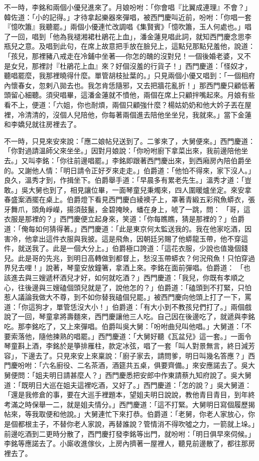 不一時，李銘和兩個小優兒進來了。月娘吩咐：「你會唱『比翼成連理』不會？」韓佐道：「小的記得。」才待拿起樂器來彈唱，被西門慶叫近前，吩咐：「你唱一套『憶吹簫』我聽罷。」兩個小優連忙改調唱《集賢賓》「憶吹簫，玉人何處也。」唱了一回，唱到「他為我褪湘裙杜鵑花上血」，潘金蓮見唱此詞，就知西門慶念思李瓶兒之意。及唱到此句，在席上故意把手放在臉兒上，這點兒那點兒羞他，說道：「孩兒，那裡豬八戒走在冷鋪中坐著──你怎的醜的沒對兒！一個後婚老婆，又不是女兒，那裡討『杜鵑花上血』來？好個沒羞的行貨子！」西門慶道：「怪奴才，聽唱罷麼，我那裡曉得什麼。單管胡枝扯葉的。」只見兩個小優又唱到：「一個相府內懷春女，忽剌八拋去也。我怎肯恁隨邪，又去把牆花亂折！」那西門慶只顧低著頭留心細聽。須臾唱畢，這潘金蓮就不憤他，兩個在席上只顧拌嘴起來。月娘有些看不上，便道：「六姐，你也耐煩，兩個只顧強什麼？楊姑奶奶和他大妗子丟在屋裡，冷清清的，沒個人兒陪他，你每著兩個進去陪他坐坐兒，我就來。」當下金蓮和李嬌兒就往房裡去了。

不一時，只見來安來說：「應二娘帖兒送到了。二爹來了，大舅便來。」西門慶道：「你對過請溫師父來坐坐。」因對月娘說：「你吩咐廚下拿菜出來，我前邊陪他坐去。」又叫李銘：「你往前邊唱罷。」李銘即跟著西門慶出來，到西廂房內陪伯爵坐的。又謝他人情：「明日請令正好歹來走走。」伯爵道：「他怕不得來，家下沒人。」良久，溫秀才到，作揖坐下。伯爵舉手道：「早晨多有累老先生。」溫秀才道：「豈敢。」吳大舅也到了，相見讓位畢，一面琴童兒秉燭來，四人圍暖爐坐定。來安拿春盛案酒擺在桌上。伯爵燈下看見西門慶白綾襖子上，罩著青緞五彩飛魚蟒衣，張牙舞爪，頭角崢嶸，揚須鼓鬣，金碧掩映，蟠在身上，唬了一跳，問： 「哥，這衣服是那裡的？」西門慶便立起身來，笑道：「你每瞧瞧，猜是那裡的？」伯爵道：「俺每如何猜得著。」西門慶道：「此是東京何太監送我的。我在他家吃酒，因害冷，他拿出這件衣服與我披。這是飛魚，因朝廷另賜了他蟒龍玉帶，他不穿這件，就送我了。此是一個大分上。」伯爵極口誇道：「這花衣服，少說也值幾個錢兒。此是哥的先兆，到明日高轉做到都督上，愁沒玉帶蟒衣？何況飛魚！只怕穿過界兒去哩！」說著，琴童安放鐘箸，拿酒上來。李銘在面前彈唱。伯爵道： 「也該進去與三嫂遞杯酒兒才好，如何就吃酒？」西門慶道：「我兒，你既有孝順之心，往後邊與三嫂磕個頭兒就是了，說他怎的？」伯爵道：「磕頭到不打緊，只怕惹人議論我做大不尊，到不如你替我磕個兒罷。」被西門慶向他頭上打了一下，罵道：「你這狗才，單管恁沒大小！」伯爵道：「有大小到不教孩兒們打了。」兩個戲說了一回，琴童拿將壽麵來，西門慶讓他三人吃。自己因在後邊吃了，就遞與李銘吃。那李銘吃了，又上來彈唱。伯爵叫吳大舅：「吩咐曲兒叫他唱。」大舅道：「不要索落他，隨他揀熟的唱罷。」西門慶道：「大舅好聽《瓦盆兒》這一套。」一面令琴童斟上酒，李銘於是箏排雁柱，款定冰弦，唱了一套「叫人對景無言，終日減芳容」，下邊去了。只見來安上來稟說：「廚子家去，請問爹，明日叫幾名答應？」西門慶吩咐：「六名廚役、二名茶酒，酒筵共五桌，俱要齊備。」來安應諾去了。吳大舅便問：「姐夫明日請甚麼人？」西門慶悉把安郎中作東請蔡九知府說了。吳大舅道：「既明日大巡在姐夫這裡吃酒，又好了。」西門慶道：「怎的說？」吳大舅道：「還是我修倉的事，要在大巡手裡題本，望姐夫明日說說，教他青目青目，到年終考滿之時保舉一二，就是姐夫情分。」西門慶道：「這不打緊。大舅明日寫個履歷揭帖來，等我取便和他說。」大舅連忙下來打恭。伯爵道：「老舅，你老人家放心，你是個都根主子，不替你老人家說，再替誰說？管情消不得吹噓之力，一箭就上垛。」前邊吃酒到二更時分散了，西門慶打發李銘等出門，就吩咐：「明日俱早來伺候。」李銘等應諾去了。小廝收進傢伙，上房內擠著一屋裡人，聽見前邊散了，都往那房裡去了。

